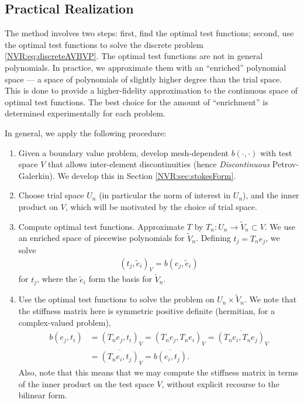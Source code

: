 \subsection{Practical Realization}\label{NVR:sec:practicalRealization}
The method involves two steps: first, find the optimal test functions; second, use the optimal test functions to solve the discrete problem \ref{NVR:eq:discreteAVBVP}.  The optimal test functions are not in general polynomials.  In practice, we approximate them with an ``enriched'' polynomial space --- a space of polynomials of slightly higher degree than the trial space.  This is done to provide a higher-fidelity approximation to the continuous space of optimal test functions.  The best choice for the amount of ``enrichment'' is determined experimentally for each problem.

In general, we apply the following procedure:
\begin{enumerate}
\sloppy
\item Given a boundary value problem, develop mesh-dependent $b(\cdot,\cdot)$ with test space $V$ that allows inter-element discontinuities (hence \emph{Discontinuous} Petrov-Galerkin).  We develop this in Section \ref{NVR:sec:stokesForm}.
\item Choose trial space $U_{n}$ (in particular the norm of interest in $U_{n}$), and the inner product on $V$, which will be motivated by the choice of trial space.
\item Compute optimal test functions.
Approximate $T$ by $T_{n}: U_{n} \rightarrow \widetilde{V}_{n} \subset V$.  We use an enriched space of piecewise polynomials for $\widetilde{V}_{n}$.  Defining $t_{j} = T_{n} e_{j}$, we solve
\begin{eqnarray*}
(t_{j},\tilde{e}_{i})_{V} = b(e_{j},\tilde{e}_{i})
\end{eqnarray*}
for $t_{j}$, where the $\tilde{e}_{i}$ form the basis for $\widetilde{V}_{n}$.
\item Use the optimal test functions to solve the problem on $U_{n} \times \widetilde{V}_{n}$.  We note that the stiffness matrix here is symmetric positive definite (hermitian, for a complex-valued problem),
\begin{align*}
b(e_{j},t_{i}) &= (T_{n}e_{j}, t_{i})_{V} = (T_{n}e_{j}, T_{n}e_{i})_{V} = \overline{(T_{n}e_{i}, T_{n}e_{j})}_{V} \\
               &= \overline{(T_{n}e_{i}, t_{j})}_{V} = \overline{b(e_{i}, t_{j})}.
\end{align*}
Also, note that this means that we may compute the stiffness matrix in terms of the inner product on the test space $V$, without explicit recourse to the bilinear form.
\end{enumerate}

